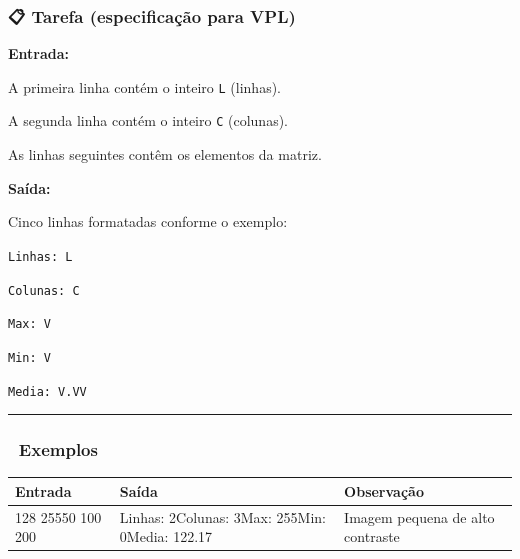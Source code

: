 \documentclass[
  portuguese,
  letterpaper,
  openany,
  oneside,
  12pt,
  a4paper]{book}
\begin{document}
\subsubsection{📋 Tarefa (especificação para
VPL)}\label{tarefa-especificauxe7uxe3o-para-vpl-1}

\textbf{Entrada:}

A primeira linha contém o inteiro \texttt{L} (linhas).

A segunda linha contém o inteiro \texttt{C} (colunas).

As linhas seguintes contêm os elementos da matriz.

\textbf{Saída:}

Cinco linhas formatadas conforme o exemplo:

\texttt{Linhas:\ L}

\texttt{Colunas:\ C}

\texttt{Max:\ V}

\texttt{Min:\ V}

\texttt{Media:\ V.VV}

\begin{center}\rule{0.5\linewidth}{0.5pt}\end{center}

\subsubsection{📌 Exemplos}\label{exemplos-1}

\begin{longtable}[]{@{}
  >{\raggedright\arraybackslash}p{}
  >{\raggedright\arraybackslash}p{}
  >{\raggedright\arraybackslash}p{}@{}}
\toprule\noalign{}
\begin{minipage}[b]{\linewidth}\raggedright
Entrada
\end{minipage} & \begin{minipage}[b]{\linewidth}\raggedright
Saída
\end{minipage} & \begin{minipage}[b]{\linewidth}\raggedright
Observação
\end{minipage} \\
\midrule\noalign{}
\endhead
\bottomrule\noalign{}
\endlastfoot
230 128 25550 100 200 & Linhas: 2Colunas: 3Max: 255Min: 0Media: 122.17 &
Imagem pequena de alto contraste \\
\end{longtable}
\end{document}

